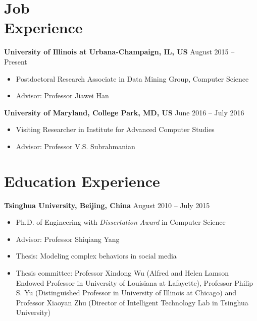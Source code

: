\documentclass[margin, 10pt]{res}
\begin{document}
\begin{resume}

\section{Job \\ Experience}

\textbf{University of Illinois at Urbana-Champaign, IL, US} \hfill{August 2015 -- Present}
\begin{itemize} \itemsep -2pt
	\item Postdoctoral Research Associate in Data Mining Group, Computer Science
	\item Advisor: Professor Jiawei Han
\end{itemize}

\textbf{University of Maryland, College Park, MD, US} \hfill{June 2016 -- July 2016}
\begin{itemize} \itemsep -2pt
	\item Visiting Researcher in Institute for Advanced Computer Studies
	\item Advisor: Professor V.S. Subrahmanian
\end{itemize}


\section{Education Experience}

\textbf{Tsinghua University, Beijing, China} \hfill{August 2010 -- July 2015}
\begin{itemize} \itemsep -2pt
\item Ph.D. of Engineering with \textit{Dissertation Award} in Computer Science
\item Advisor: Professor Shiqiang Yang
\item Thesis: Modeling complex behaviors in social media
\item Thesis committee: Professor Xindong Wu (Alfred and Helen Lamson Endowed Professor in University of Louisiana at Lafayette), Professor Philip S. Yu (Distinguished Professor in University of Illinois at Chicago) and Professor Xiaoyan Zhu (Director of Intelligent Technology Lab in Tsinghua University)
\end{itemize}


\end{resume}
\end{document}
